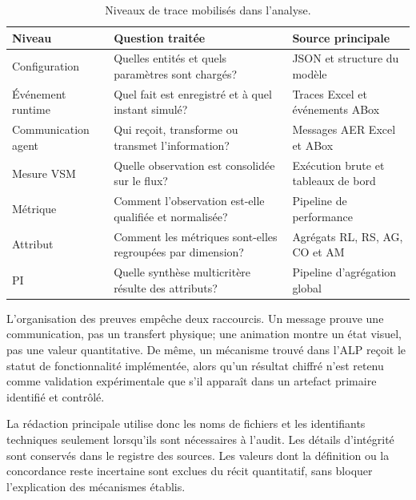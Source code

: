 \begin{table}[H]
  \centering
  \caption{Niveaux de trace mobilisés dans l'analyse.}
  \label{tab:niveaux-preuve}
  \begin{tabularx}{\textwidth}{@{}L{0.23\textwidth}Y L{0.28\textwidth}@{}}
    \toprule
    Niveau & Question traitée & Source principale \\
    \midrule
    Configuration & Quelles entités et quels paramètres sont chargés? & JSON et structure du modèle \\
    Événement runtime & Quel fait est enregistré et à quel instant simulé? & Traces Excel et événements ABox \\
    Communication agent & Qui reçoit, transforme ou transmet l'information? & Messages AER Excel et ABox \\
    Mesure VSM & Quelle observation est consolidée sur le flux? & Exécution brute et tableaux de bord \\
    Métrique & Comment l'observation est-elle qualifiée et normalisée? & Pipeline de performance \\
    Attribut & Comment les métriques sont-elles regroupées par dimension? & Agrégats RL, RS, AG, CO et AM \\
    PI & Quelle synthèse multicritère résulte des attributs? & Pipeline d'agrégation global \\
    \bottomrule
  \end{tabularx}
\end{table}

L'organisation des preuves empêche deux raccourcis. Un message prouve une communication, pas un transfert physique; une animation montre un état visuel, pas une valeur quantitative. De même, un mécanisme trouvé dans l'ALP reçoit le statut de fonctionnalité implémentée, alors qu'un résultat chiffré n'est retenu comme validation expérimentale que s'il apparaît dans un artefact primaire identifié et contrôlé.

La rédaction principale utilise donc les noms de fichiers et les identifiants techniques seulement lorsqu'ils sont nécessaires à l'audit. Les détails d'intégrité sont conservés dans le registre des sources. Les valeurs dont la définition ou la concordance reste incertaine sont exclues du récit quantitatif, sans bloquer l'explication des mécanismes établis.
